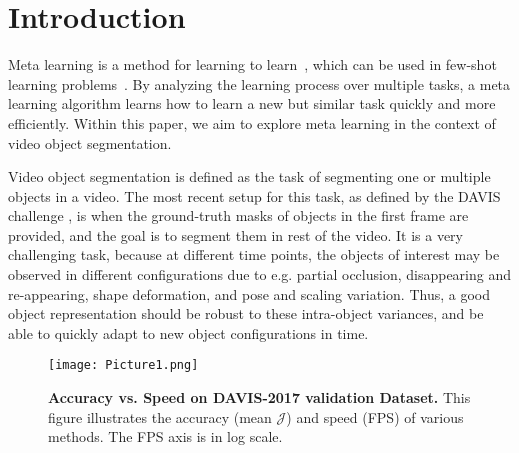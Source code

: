 \documentclass[10pt,twocolumn,letterpaper]{article}
\begin{document}
\vspace{-0.15in}\section{Introduction}%
Meta learning is a method for learning to learn~\cite{Schmidhuber, bengio:1995:oban}, which can be used in few-shot learning problems~\cite{Hugo, NIPS2016_6385, NIPS2017_6996}. By analyzing the learning process over multiple tasks, a meta learning algorithm learns how to learn a new but similar task quickly and more efficiently.
Within this paper, we aim to explore meta learning in the context of video object segmentation.


Video object segmentation is defined as the task of segmenting one or multiple objects in a video. The most recent setup for this task, as defined by the DAVIS challenge \cite{Caelles_arXiv_2018, davis_2017}, is when the ground-truth masks of objects in the first frame are provided, and the goal is to segment them in rest of the video. 
It is a very challenging task, because at different time points, the objects of interest may be observed in different configurations due to e.g. partial occlusion, disappearing and re-appearing, shape deformation, and pose and scaling variation.
Thus, a good object representation should be robust to these intra-object variances, and be able to quickly adapt to new object configurations in time.

\begin{figure}[t!]
	\centering
	\texttt{[image: Picture1.png]}
	\caption{{\bf Accuracy vs. Speed on DAVIS-2017 validation Dataset.} This figure illustrates the accuracy (mean $\mathcal{J}$) and speed (FPS) of various methods. The FPS axis is in log scale.}
	\label{fig:chart}   
\end{figure}
\end{document}
